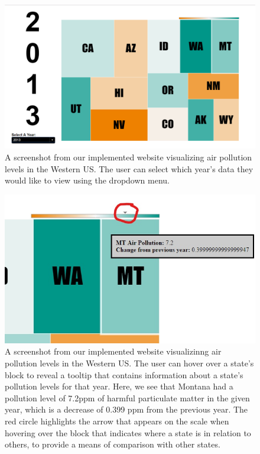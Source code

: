 \documentclass[journal]{vgtc}                %
\begin{document}
\begin{figure}
   \includegraphics[width=\columnwidth]{2013_viz.png}
   \caption{A screenshot from our implemented website visualizing air pollution levels in the Western US. The user can select which year's data they
   would like to view using the dropdown menu. \label{fig:screenshot_all}}
\end{figure}

\begin{figure}
   \includegraphics[width=\columnwidth]{screenshot_hover.jpg}
   \caption{A screenshot from our implemented website visualizinng air pollution levels in the Western US. The user can hover over a state's block
   to reveal a tooltip that contains information about a state's pollution levels for that year. Here, we see that Montana had a pollution level of
   7.2ppm of harmful particulate matter in the given year, which is a decrease of 0.399 ppm from the previous year. The red circle highlights the arrow
   that appears on the scale when hovering over the block that indicates where a state is in relation to others, to provide a means of comparison 
   with other states.\label{fig:screenshot_hover}}
\end{figure}
\end{document}

